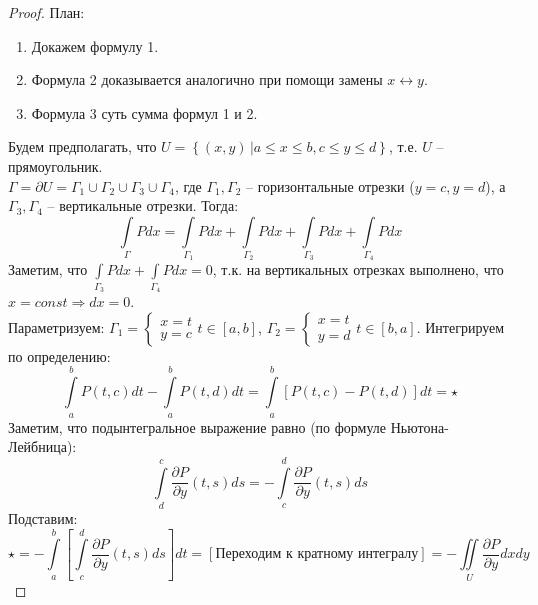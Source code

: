 \begin{proof}
    План:
    \begin{enumerate}
        \item Докажем формулу 1.
        \item Формула 2 доказывается аналогично при помощи замены $x \leftrightarrow y$.
        \item Формула 3 суть сумма формул 1 и 2.
    \end{enumerate}
    Будем предполагать, что $U = \left\{ (x, y) \, | a \leqslant x \leqslant b, c \leqslant y \leqslant d \right\}$,
    т.е. $U$ -- прямоугольник.\\
    $\Gamma = \partial U = \Gamma_1 \cup \Gamma_2 \cup \Gamma_3 \cup \Gamma_4$, где $\Gamma_1, \Gamma_2$ -- горизонтальные отрезки ($y = c, y = d$),
    а $\Gamma_3, \Gamma_4$ -- вертикальные отрезки. Тогда:
    \[
        \int\limits_{\Gamma} Pdx =
        \int\limits_{\Gamma_1} Pdx + \int\limits_{\Gamma_2} Pdx + \int\limits_{\Gamma_3} Pdx + \int\limits_{\Gamma_4} Pdx
    \]
    Заметим, что $\int\limits_{\Gamma_3} Pdx + \int\limits_{\Gamma_4} Pdx = 0$,
    т.к. на вертикальных отрезках выполнено, что $x = const \Rightarrow dx = 0$.\\
    Параметризуем: $\Gamma_1 = \begin{cases} x = t\\ y = c\end{cases} t \in [a, b]$, $\Gamma_2 = \begin{cases} x = t\\ y = d\end{cases} t \in [b, a]$.
    Интегрируем по определению:
    \[
        \int\limits_{a}^{b} P(t, c)dt - \int\limits_{a}^{b} P(t, d)dt =
        \int\limits_{a}^{b} \left[P(t, c) - P(t, d) \right] dt = \star
    \]
    Заметим, что подынтегральное выражение равно (по формуле Ньютона-Лейбница):
    \[
        \int\limits_{d}^{c} \frac{\partial P}{\partial y}(t, s)ds =
        -\int\limits_{c}^{d} \frac{\partial P}{\partial y}(t, s)ds
    \]
    Подставим:
    \[
        \star = -\int\limits_a^b \left[\int\limits_{c}^{d} \frac{\partial P}{\partial y}(t, s)ds \right]dt = [\text{Переходим к кратному интегралу}] =
        -\iint\limits_{U} \frac{\partial P}{\partial y}dxdy
    \]
\end{proof}
